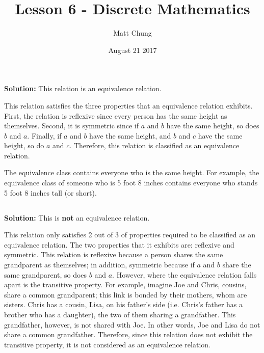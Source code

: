 \documentclass{article}
\title{Lesson 6 - Discrete Mathematics}
\author{Matt Chung}
\date{August 21 2017}
\begin{document}
\maketitle

\section{}

\subsection{}

\textbf{Solution:} This relation is an equivalence relation.

This relation satisfies the three properties that an equivalence relation exhibits.  First, the relation is reflexive since every person has the same height as themselves. Second, it is symmetric since if $a$ and $b$ have the same height, so does $b$ and $a$. Finally, if $a$ and $b$ have the same height, and $b$ and $c$ have the same height, so do $a$ and $c$. Therefore, this relation is classified as an equivalence relation.

The equivalence class contains everyone who is the same height. For example, the equivalence class of someone who is 5 foot 8 inches contains everyone who stands 5 foot 8 inches tall (or short).

\subsection{}

\textbf{Solution:} This is \textbf{not} an equivalence relation.

This relation only satisfies 2 out of 3 of properties required to be classified as an equivalence relation. The two properties that it exhibits are: reflexive and symmetric. This relation is reflexive because a person shares the same grandparent as themselves; in addition, symmetric because if $a$ and $b$ share the same grandparent, so does $b$ and $a$. However, where the equivalence relation falls apart is the transitive property. For example, imagine Joe and Chris, cousins, share a common grandparent; this link is bonded by their mothers, whom are sisters.  Chris has a cousin, Lisa, on his father's side (i.e. Chris's father has a brother who has a daughter), the two of them sharing a grandfather. This grandfather, however, is not shared with Joe. In other words, Joe and Lisa do not share a common grandfather. Therefore, since this relation does not exhibit the transitive property, it is not considered as an equivalence relation.
\end{document}
